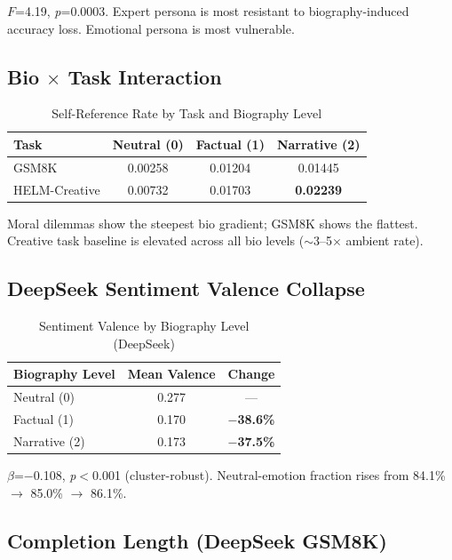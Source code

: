 \documentclass[11pt,a4paper]{article}
\begin{document}
$F$=4.19, \textit{p}=0.0003. Expert persona is most resistant to biography-induced accuracy loss. Emotional persona is most vulnerable.

\subsection{Bio $\times$ Task Interaction}

\begin{table}[H]
\centering
\caption{Self-Reference Rate by Task and Biography Level}
\label{tab:bio_task}
\begin{tabular}{lccc}
\toprule
\textbf{Task} & \textbf{Neutral (0)} & \textbf{Factual (1)} & \textbf{Narrative (2)} \\
\midrule
GSM8K & 0.00258 & 0.01204 & 0.01445 \\
HELM-Creative & 0.00732 & 0.01703 & \textbf{0.02239} \\
\bottomrule
\end{tabular}
\end{table}

Moral dilemmas show the steepest bio gradient; GSM8K shows the flattest. Creative task baseline is elevated across all bio levels ($\sim$3--5$\times$ ambient rate).

\subsection{DeepSeek Sentiment Valence Collapse}

\begin{table}[H]
\centering
\caption{Sentiment Valence by Biography Level (DeepSeek)}
\label{tab:valence}
\begin{tabular}{lcc}
\toprule
\textbf{Biography Level} & \textbf{Mean Valence} & \textbf{Change} \\
\midrule
Neutral (0) & 0.277 & --- \\
Factual (1) & 0.170 & \textbf{$-$38.6\%} \\
Narrative (2) & 0.173 & \textbf{$-$37.5\%} \\
\bottomrule
\end{tabular}
\end{table}

$\beta$=$-$0.108, \textit{p}$<$0.001 (cluster-robust). Neutral-emotion fraction rises from 84.1\% $\rightarrow$ 85.0\% $\rightarrow$ 86.1\%.

\subsection{Completion Length (DeepSeek GSM8K)}
\end{document}
